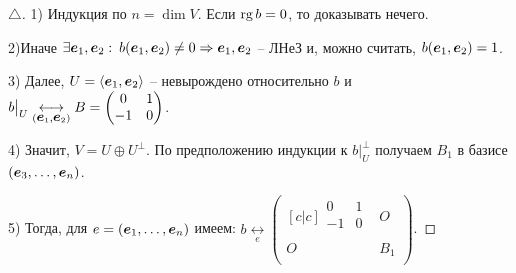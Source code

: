 \begin{proof}[$\triangle$]
	1) Индукция по $n = \dim V$. Если $\mathop{\mathrm{rg}}\nolimits b = 0$, то доказывать нечего.

	2)Иначе $\exists \mbox{\boldmath $e$}_1, \mbox{\boldmath $e$}_2:\: b(\mbox{\boldmath $e$}_1, \mbox{\boldmath $e$}_2) \neq0 \Rightarrow \mbox{\boldmath $e$}_1, \mbox{\boldmath $e$}_2$ -- ЛНеЗ и, можно считать, $b(\mbox{\boldmath $e$}_1,\mbox{\boldmath $e$}_2)= 1$.

	3) Далее, $U = \langle \mbox{\boldmath $e$}_1, \mbox{\boldmath $e$}_2\rangle$ -- невырождено относительно $b$
	и $b \big|_U \underset{(\mbox{\boldmath $e$}_1, \mbox{\boldmath $e$}_2)}{\longleftrightarrow} B = \begin{pmatrix} 0&1\\ -1&0\\ \end{pmatrix}$.

	4) Значит, $V = U \oplus U^\bot$. По предположению индукции к $b \big|_U^\bot$ получаем $B_1$ в базисе $(\mbox{\boldmath $e$}_3,\ldots,\mbox{\boldmath $e$}_n)$.

	5) Тогда, для $e = (\mbox{\boldmath $e$}_1,\ldots,\mbox{\boldmath $e$}_n)$ имеем: $b \underset{e}{\longleftrightarrow} 
	\begin{pmatrix}[c|c]
		\begin{matrix}0&1\\-1&0\\\end{matrix} & O\\
		\hline
		O& B_1\\
	\end{pmatrix}
	$.
\end{proof}

